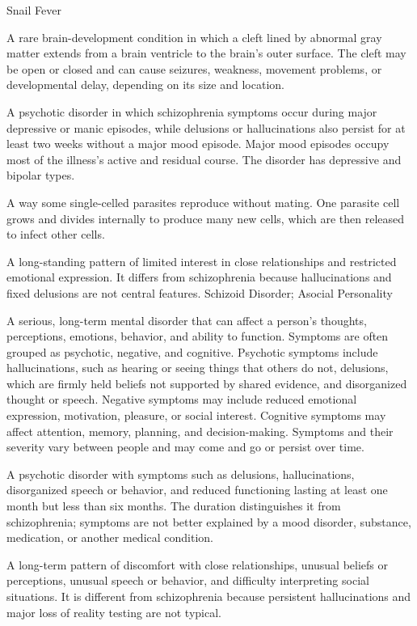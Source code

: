 \synonyms
Snail Fever

 A rare brain-development condition in which a cleft lined by abnormal gray matter extends from a brain ventricle to the brain's outer surface. The cleft may be open or closed and can cause seizures, weakness, movement problems, or developmental delay, depending on its size and location.

 A psychotic disorder in which schizophrenia symptoms occur during major depressive or manic episodes, while delusions or hallucinations also persist for at least two weeks without a major mood episode. Major mood episodes occupy most of the illness’s active and residual course. The disorder has depressive and bipolar types.

 A way some single-celled parasites reproduce without mating. One parasite cell grows and divides internally to produce many new cells, which are then released to infect other cells.

 A long-standing pattern of limited interest in close relationships and restricted emotional expression. It differs from schizophrenia because hallucinations and fixed delusions are not central features.
\synonyms
Schizoid Disorder; Asocial Personality

 A serious, long-term mental disorder that can affect a person’s thoughts, perceptions, emotions, behavior, and ability to function. Symptoms are often grouped as psychotic, negative, and cognitive. Psychotic symptoms include hallucinations, such as hearing or seeing things that others do not, delusions, which are firmly held beliefs not supported by shared evidence, and disorganized thought or speech. Negative symptoms may include reduced emotional expression, motivation, pleasure, or social interest. Cognitive symptoms may affect attention, memory, planning, and decision-making. Symptoms and their severity vary between people and may come and go or persist over time.

 A psychotic disorder with symptoms such as delusions, hallucinations, disorganized speech or behavior, and reduced functioning lasting at least one month but less than six months. The duration distinguishes it from schizophrenia; symptoms are not better explained by a mood disorder, substance, medication, or another medical condition.

 A long-term pattern of discomfort with close relationships, unusual beliefs or perceptions, unusual speech or behavior, and difficulty interpreting social situations. It is different from schizophrenia because persistent hallucinations and major loss of reality testing are not typical.

